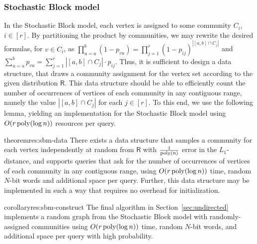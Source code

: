 \subsubsection{Stochastic Block model}
\label{sec:app_sbm}
In the Stochastic Block model, each vertex is assigned to some community $C_i$, $i \in [r]$.
By partitioning the product by communities, we may rewrite the desired formulas, for $v \in C_i$,
as $\prod_{u=a}^b (1-p_{vu}) = \prod_{j=1}^r (1-p_{ij})^{|[a,b]\cap C_j|}$ and $\sum_{u=a}^b p_{vu}=\sum_{j=1}^r |[a,b]\cap C_j|\cdot p_{ij}$.
Thus, it is sufficient to design a data structure,
that draws a community assignment for the vertex set according to the given distribution $\mathsf{R}$.
This data structure should be able to efficiently count the number of occurrences of vertices of each community in any contiguous range,
namely the value $|[a,b]\cap C_j|$ for each $j \in [r]$.
To this end, we use the following lemma,
yielding an implementation for the Stochastic Block model using $O(r\, \mathrm{poly}(\log n))$ resources per query.

\begin{restatable}{theorem}{res:sbm-data}\label{thm:sbm-data}
There exists a data structure that samples a community for each vertex independently at random from $\mathsf{R}$
with $\frac{1}{\mathrm{poly}(n)}$ error in the $L_1$-distance, and supports queries that ask for the number of occurrences of vertices of each community
in any contiguous range, using $O(r\,\mathrm{poly}(\log n))$ time, random $N$-bit words and additional space per query.
Further, this data structure may be implemented in such a way that requires no overhead for initialization.
\end{restatable}
\begin{restatable}{corollary}{res:sbm-construct}\label{cor:sbm-construct}
The final algorithm in Section~\ref{sec:undirected} implements a random graph from the Stochastic Block model with randomly-assigned communities
using $O(r\,\mathrm{poly}(\log n))$ time, random $N$-bit words, and additional space per query with high probability.
\end{restatable}

